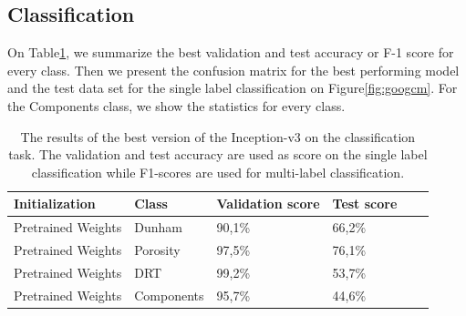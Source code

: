 \subsection{Classification}
On Table\ref{tab:googbest}, we summarize the best validation and test accuracy or F-1 score for every class. Then we present the confusion matrix for the best performing model and the test data set for the single label classification on Figure\ref{fig:googcm}. For the Components class, we show the statistics for every class. 

\begin{table}
\caption{\label{tab:googbest} The results of the best version of the Inception-v3 on the classification task. The validation and test accuracy are used as score on the single label classification while F1-scores are used for multi-label classification.}
\centering
\begin{tabular}[b]{| l | l | l | l | l |}
\hline
    Initialization & Class & Validation score & Test score \ \\ \hline
    Pretrained Weights & Dunham &  90,1\%  & 66,2\% \\ \hline
    Pretrained Weights & Porosity & 97,5\%  &  76,1\% \\ \hline
    Pretrained Weights &DRT & 99,2\% & 53,7\% \\ \hline
    Pretrained Weights &Components & 95,7\% &  44,6\% \\ \hline
\end{tabular} 
\end{table}


